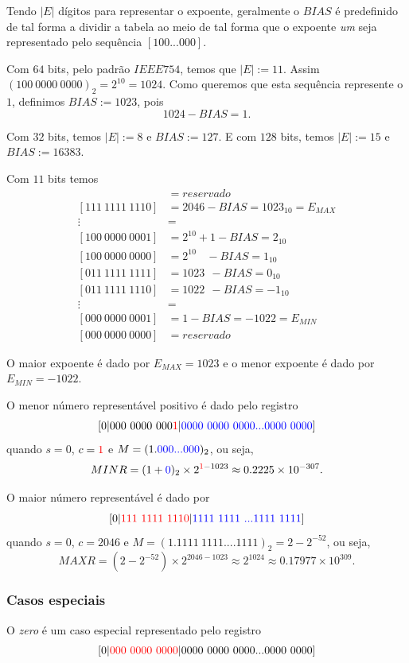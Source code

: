 \documentclass[main.tex]{subfiles}
\begin{document}
Tendo $|E|$ dígitos para representar o expoente, geralmente o $BIAS$ é predefinido de tal forma a dividir a tabela ao meio de tal forma que o expoente \textit{um} seja representado pelo sequência $[100...000]$. 

\begin{ex}
Com $64$ bits, pelo padrão $IEEE754$, temos que $|E|:=11$. Assim $(100~0000~0000)_2=2^{10}=1024$. Como queremos que esta sequência represente o $1$, definimos $BIAS:=1023$, pois
$$ 1024-BIAS=1.$$

Com $32$ bits, temos $|E|:=8$ e $BIAS:=127$. E com $128$ bits, temos $|E|:=15$ e $BIAS:=16383$.
\end{ex}


Com $11$ bits temos 
\begin{align*}
 [111~1111~1111] &= reservado\\
 [111~1111~1110] &= 2046-BIAS      = 1023_{10}= E_{MAX}\\
     \vdots      &=  \\
 [100~0000~0001] &= 2^{10}+1  -BIAS =  2_{10} \\
 [100~0000~0000] &= 2^{10}~~~~-BIAS =  1_{10} \\
 [011~1111~1111] &= 1023   ~~ -BIAS =  0_{10} \\
 [011~1111~1110] &= 1022   ~~ -BIAS = -1_{10} \\
     \vdots      &=  \\
 [000~0000~0001] &= 1-BIAS = -1022 = E_{MIN}\\
 [000~0000~0000] &= reservado
\end{align*}

O maior expoente é dado por $E_{MAX}=1023$ e o menor expoente é dado por $E_{MIN}=-1022$.



O menor número representável positivo é dado pelo registro
$$
[0|000~0000~000{\color{red}{1}} |{\color{blue}{0000~0000~0000...0000~0000}}]
$$
quando $s=0$, $c={\color{red}{1}}$ e $M=(1.{\color{blue}{000...000}})_2$, ou seja,
$$
MINR=(1+{\color{blue}{0}})_2\times 2^{{\color{red}{1}}-1023} \approx 0.2225\times 10^{-307}.
$$

O maior número representável é dado por
$$
[0|{\color{red}{111~1111~1110}} |{\color{blue}{1111~1111~...1111~1111}}]
$$
quando $s=0$, $c=2046$ e $M=(1.1111~1111....1111)_2=2-2^{-52}$, ou seja,
$$
MAXR=(2-2^{-52})\times 2^{2046-1023} \approx 2^{1024}\approx0.17977\times 10^{309}.
$$


\subsubsection{Casos especiais}
O \emph{zero} é um caso especial representado pelo registro 
$$
[0|{\color{red}{000~0000~0000}} |0000~0000~0000...0000~0000]
$$
\end{document}
